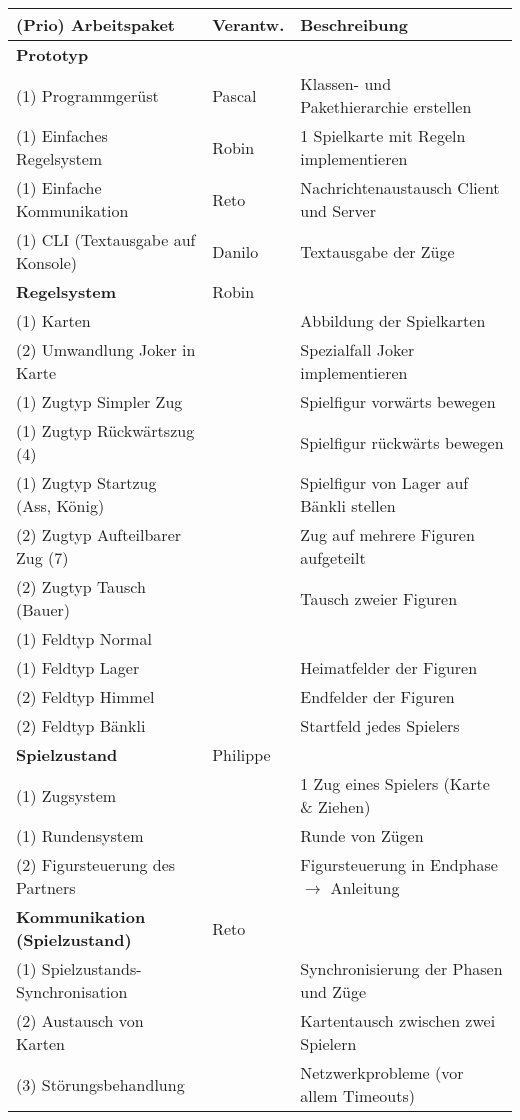 \documentclass[a4paper,12pt,halfparskip,DIV14]{scrreprt}
\begin{document}
\begin{tabular}{@{} l l l @{}}
\toprule
(Prio) Arbeitspaket & Verantw. & Beschreibung \\
\midrule
\textbf{Prototyp} &  & \\
(1) Programmgerüst & Pascal & Klassen- und Pakethierarchie erstellen \\
(1) Einfaches Regelsystem & Robin & 1 Spielkarte mit Regeln implementieren \\
(1) Einfache Kommunikation & Reto & Nachrichtenaustausch Client und Server \\
(1) CLI (Textausgabe auf Konsole) & Danilo & Textausgabe der Züge \\
\midrule
\textbf{Regelsystem} & Robin & \\
(1) Karten &  & Abbildung der Spielkarten \\
(2) Umwandlung Joker in Karte &  & Spezialfall Joker implementieren \\
(1) Zugtyp Simpler Zug &  & Spielfigur vorwärts bewegen \\
(1) Zugtyp Rückwärtszug (4) &  & Spielfigur rückwärts bewegen \\
(1) Zugtyp Startzug (Ass, König) &  & Spielfigur von Lager auf Bänkli stellen \\
(2) Zugtyp Aufteilbarer Zug (7) &  & Zug auf mehrere Figuren aufgeteilt \\
(2) Zugtyp Tausch (Bauer) &  & Tausch zweier Figuren \\
(1) Feldtyp Normal &  & \\
(1) Feldtyp Lager &  & Heimatfelder der Figuren \\
(2) Feldtyp Himmel &  & Endfelder der Figuren \\
(2) Feldtyp Bänkli &  & Startfeld jedes Spielers \\
\midrule
\textbf{Spielzustand} & Philippe & \\
(1) Zugsystem &  & 1 Zug eines Spielers (Karte \& Ziehen) \\
(1) Rundensystem &  & Runde von Zügen \\
(2) Figursteuerung des Partners &  & Figursteuerung in Endphase $\rightarrow$ Anleitung \\
\midrule
\textbf{Kommunikation (Spielzustand)} & Reto & \\
(1) Spielzustands-Synchronisation &  & Synchronisierung der Phasen und Züge \\
(2) Austausch von Karten &  & Kartentausch zwischen zwei Spielern \\
(3) Störungsbehandlung &  & Netzwerkprobleme (vor allem Timeouts) \\

\end{tabular}
\end{document}
